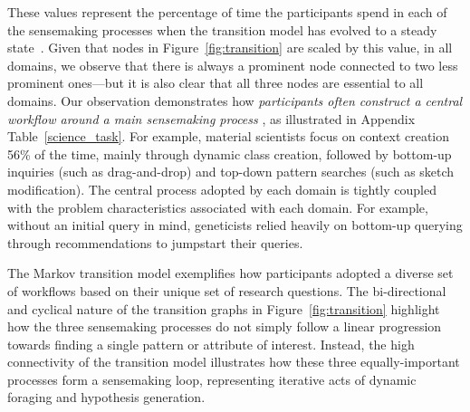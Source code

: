  These values represent the percentage of time the participants
 spend in each of the sensemaking processes
 when the transition model has evolved to a steady state~\cite{pierre2011}.
 Given that nodes in Figure~\ref{fig:transition}
 are scaled by this value, in all domains,
 we observe that there is always a prominent node
 connected to two less prominent ones---but it is also clear
 that all three nodes are essential to all domains.
 Our observation demonstrates how \emph{participants
 often construct a central workflow
 around a main sensemaking process }, as illustrated in Appendix Table~\ref{science_task}. For example, material scientists focus on context creation 56\% of the time, mainly through dynamic class creation,
 followed by bottom-up inquiries (such as drag-and-drop)
  and top-down pattern searches (such as sketch modification).
 The central process adopted by each domain
 is tightly coupled with the problem characteristics associated with each domain. For example, without an initial query in mind,
 geneticists relied heavily on bottom-up querying
 through recommendations to jumpstart their queries.
 \par The Markov transition model exemplifies how participants
 adopted a diverse set of workflows
 based on their unique set of research questions. The bi-directional and cyclical nature
 of the transition graphs in Figure~\ref{fig:transition} highlight how the three sensemaking processes do not simply follow a linear progression towards finding a single pattern or attribute of interest. %
 Instead, the high connectivity of the transition model illustrates how these three equally-important processes form a sensemaking loop, representing iterative acts of dynamic foraging and hypothesis generation.  %
